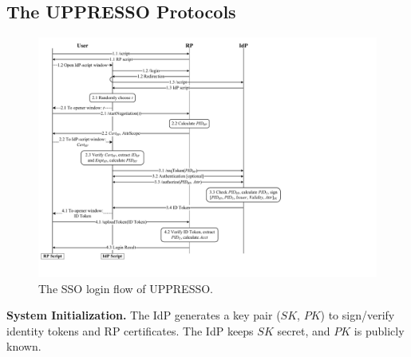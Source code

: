 


\subsection{The UPPRESSO Protocols}
\label{implementations}

\begin{figure}[bt]
  \centering
  \includegraphics[height=0.58\textheight]{fig/process-js.pdf}
  \caption{The SSO login flow of UPPRESSO.}
  \label{fig:process}
\end{figure}


\noindent \textbf{System Initialization.}
The IdP generates a key pair ($SK$, $PK$) to sign/verify identity tokens and RP certificates.
The IdP keeps $SK$ secret, and $PK$ is publicly known.


